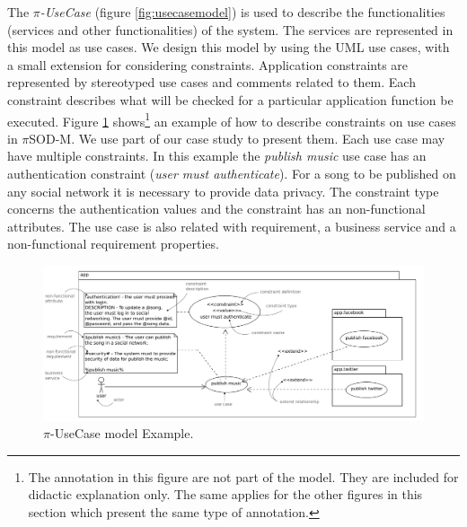 The \textit{$\pi$-UseCase} (figure \ref{fig:usecasemodel}) is used
to describe the functionalities (services and other functionalities) of the system. The
services are represented in this model as use cases. We design this model by
using the UML use cases, with a small extension for considering constraints.
Application constraints are represented by stereotyped use cases and comments
related to them. Each constraint describes what will be checked for a
particular application function be executed. Figure \ref{fig:piUseCaseExample}
shows\footnote{The annotation in this figure are not part of
the model. They are included for didactic explanation only. The same applies for
the other figures in this section which present the same type of annotation.} an
example of how to describe constraints on use cases in $\pi$SOD-M. We use part
of our case study to present them. Each use case may have multiple constraints.
In this example the \textit{publish music} use case has an authentication
constraint (\textit{user must authenticate}). For a song to be published on any
social network it is necessary to provide data privacy. The constraint type
concerns the authentication values and the constraint has an non-functional
attributes. The use case is also related with requirement, a business service
and a non-functional requirement properties.
 


\begin{figure}[ht!] 
\centering
\includegraphics[width=.99\textwidth]{chapters/methodology/figs/piUseCase-Example_detail.pdf}
\caption{$\pi$-UseCase model Example.}
\label{fig:piUseCaseExample} 
\end{figure}

%  
 
